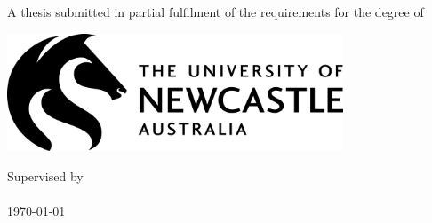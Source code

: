 
\begin{titlepage}
\makeatletter

	\vspace*{\fill}
		
	\begin{flushleft}

		\begin{flushleft}
			\huge\textbf{\textsf{\@title}}
		\end{flushleft}

		\vspace{0.5cm}\par
		\LARGE\textbf{\@author}

		\vspace{0.5cm}\par
		\Large{A thesis submitted in partial fulfilment of the requirements for the degree of \degree}

	\end{flushleft}

	\vfill

	\begin{center}

		\begin{center}
			\includegraphics[width=0.75\textwidth]{images/title/uon_logo.jpg}
		\end{center}

		\large{Supervised by \supervisor \\ \institute \\ \today}

	\end{center}

	\vspace*{\fill}

\makeatother
\end{titlepage}
